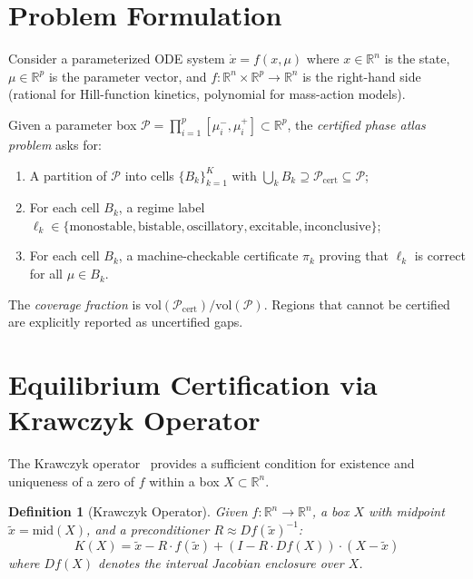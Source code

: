 \documentclass[11pt]{article}
\newtheorem{definition}[theorem]{Definition}
\newcommand{\R}{\mathbb{R}}
\begin{document}
\section{Problem Formulation}
\label{sec:problem}

Consider a parameterized ODE system $\dot{x} = f(x, \mu)$ where $x \in \R^n$ is the state, $\mu \in \R^p$ is the parameter vector, and $f: \R^n \times \R^p \to \R^n$ is the right-hand side (rational for Hill-function kinetics, polynomial for mass-action models).

Given a parameter box $\mathcal{P} = \prod_{i=1}^p [\mu_i^-, \mu_i^+] \subset \R^p$, the \emph{certified phase atlas problem} asks for:
\begin{enumerate}
\item A partition of $\mathcal{P}$ into cells $\{B_k\}_{k=1}^K$ with $\bigcup_k B_k \supseteq \mathcal{P}_{\text{cert}} \subseteq \mathcal{P}$;
\item For each cell $B_k$, a regime label $\ell_k \in \{\text{monostable}, \text{bistable}, \text{oscillatory}, \text{excitable}, \text{inconclusive}\}$;
\item For each cell $B_k$, a machine-checkable certificate $\pi_k$ proving that $\ell_k$ is correct for all $\mu \in B_k$.
\end{enumerate}

The \emph{coverage fraction} is $\text{vol}(\mathcal{P}_{\text{cert}}) / \text{vol}(\mathcal{P})$.
Regions that cannot be certified are explicitly reported as uncertified gaps.

\section{Equilibrium Certification via Krawczyk Operator}
\label{sec:krawczyk}

The Krawczyk operator~\cite{krawczyk1969newton} provides a sufficient condition for existence and uniqueness of a zero of $f$ within a box $X \subset \R^n$.

\begin{definition}[Krawczyk Operator]
Given $f: \R^n \to \R^n$, a box $X$ with midpoint $\tilde{x} = \mathrm{mid}(X)$, and a preconditioner $R \approx Df(\tilde{x})^{-1}$:
\[
K(X) = \tilde{x} - R \cdot f(\tilde{x}) + (I - R \cdot Df(X)) \cdot (X - \tilde{x})
\]
where $Df(X)$ denotes the interval Jacobian enclosure over $X$.
\end{definition}
\end{document}
